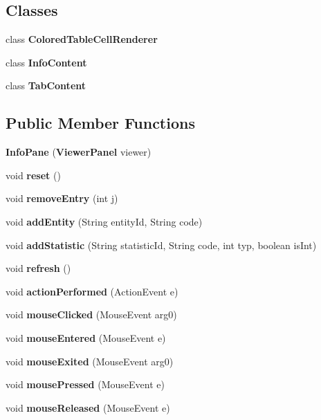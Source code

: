 \subsection*{Classes}
\begin{DoxyCompactItemize}
\item 
class {\bfseries Colored\-Table\-Cell\-Renderer}
\item 
class {\bfseries Info\-Content}
\item 
class {\bfseries Tab\-Content}
\end{DoxyCompactItemize}
\subsection*{Public Member Functions}
\begin{DoxyCompactItemize}
\item 
{\bf Info\-Pane} ({\bf Viewer\-Panel} viewer)
\item 
void {\bf reset} ()
\item 
void {\bf remove\-Entry} (int j)
\item 
void {\bf add\-Entity} (String entity\-Id, String code)
\item 
void {\bf add\-Statistic} (String statistic\-Id, String code, int typ, boolean is\-Int)
\item 
void {\bf refresh} ()
\item 
void {\bf action\-Performed} (Action\-Event e)
\item 
void {\bfseries mouse\-Clicked} (Mouse\-Event arg0)\label{classdesmoj_1_1extensions_1_1visualization2d_1_1engine_1_1viewer_1_1_info_pane_a9f2aa83d5e5a0d1310657c6c79c004d2}

\item 
void {\bfseries mouse\-Entered} (Mouse\-Event e)\label{classdesmoj_1_1extensions_1_1visualization2d_1_1engine_1_1viewer_1_1_info_pane_ac082ecd45e4a77d589f07d2dac7db143}

\item 
void {\bfseries mouse\-Exited} (Mouse\-Event arg0)\label{classdesmoj_1_1extensions_1_1visualization2d_1_1engine_1_1viewer_1_1_info_pane_abd3ad27e3a38df46c200d5fc0107581a}

\item 
void {\bfseries mouse\-Pressed} (Mouse\-Event e)\label{classdesmoj_1_1extensions_1_1visualization2d_1_1engine_1_1viewer_1_1_info_pane_af06e8de65bb2edc08bc2747dacc39899}

\item 
void {\bfseries mouse\-Released} (Mouse\-Event e)\label{classdesmoj_1_1extensions_1_1visualization2d_1_1engine_1_1viewer_1_1_info_pane_aa7cfc8bce0f514717342d6bd63e33d3b}

\end{DoxyCompactItemize}


